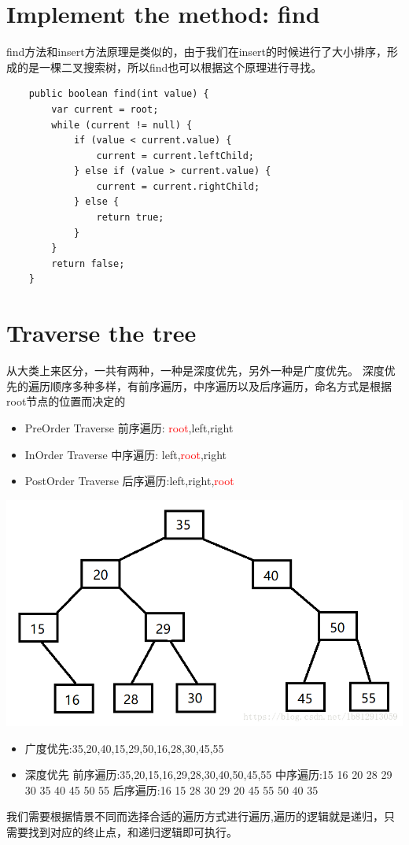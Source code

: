 \documentclass[
	11pt,
	fleqn,
	a4paper,
]{LegrandOrangeBook}
\begin{document}
\section{Implement the method: find}
find方法和insert方法原理是类似的，由于我们在insert的时候进行了大小排序，形成的是一棵二叉搜索树，所以find也可以根据这个原理进行寻找。
\begin{verbatim}
    public boolean find(int value) {
        var current = root;
        while (current != null) {
            if (value < current.value) {
                current = current.leftChild;
            } else if (value > current.value) {
                current = current.rightChild;
            } else {
                return true;
            }
        }
        return false;
    }
\end{verbatim}

\section{Traverse the tree}
从大类上来区分，一共有两种，一种是深度优先，另外一种是广度优先。
深度优先的遍历顺序多种多样，有前序遍历，中序遍历以及后序遍历，命名方式是根据root节点的位置而决定的
\begin{itemize}
    \item PreOrder Traverse 前序遍历: \textcolor{red}{root},left,right
    \item InOrder Traverse 中序遍历: left,\textcolor{red}{root},right
    \item PostOrder Traverse 后序遍历:left,right,\textcolor{red}{root}
\end{itemize}

\begin{center}
    \includegraphics[scale=0.4]{Images/depth.jpg}
\end{center}
\begin{itemize}
    \item 广度优先:35,20,40,15,29,50,16,28,30,45,55
    \item 深度优先
          \subitem 前序遍历:35,20,15,16,29,28,30,40,50,45,55
          \subitem 中序遍历:15 16 20 28 29 30 35 40 45 50 55
          \subitem 后序遍历:16 15 28 30 29 20 45 55 50 40 35
\end{itemize}
我们需要根据情景不同而选择合适的遍历方式进行遍历,遍历的逻辑就是递归，只需要找到对应的终止点，和递归逻辑即可执行。
\end{document}
